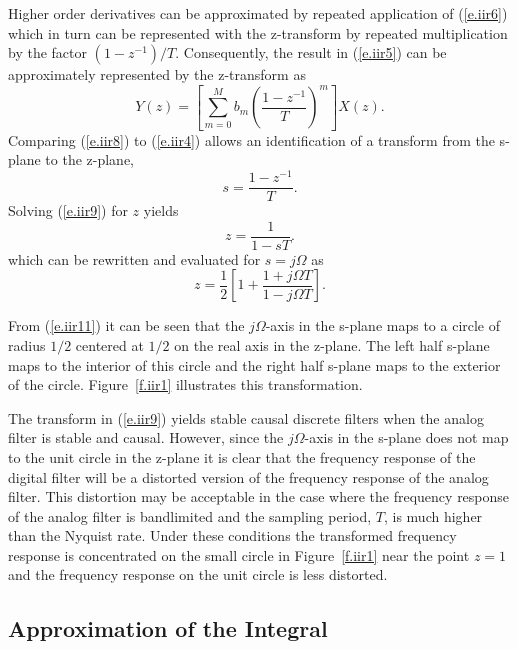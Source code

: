 	Higher order derivatives can be approximated by
repeated application of (\ref{e.iir6}) which in turn can be
represented with the z-transform by repeated multiplication
by the factor $(1-z^{-1})/T$.  Consequently, the result
in (\ref{e.iir5}) can be approximately represented by the z-transform
as
%
\begin{equation}
[\sum_{n=0}^{N}a_n(\frac{1-z^{-1}}{T})^n]Y(z)
=[\sum_{m=0}^{M}b_m(\frac{1-z^{-1}}{T})^m]X(z).
\label{e.iir8}
\end{equation}
%
Comparing (\ref{e.iir8}) to (\ref{e.iir4}) allows an identification of a
transform from the s-plane to the z-plane,
%
\begin{equation}
s=\frac{1-z^{-1}}{T}.
\label{e.iir9}
\end{equation}
%
Solving (\ref{e.iir9}) for $z$ yields
%
\begin{equation}
z=\frac{1}{1-sT}.
\label{e.iir10}
\end{equation}
%
which can be rewritten and evaluated for
$s=j\Omega$ as
%
\begin{equation}
z=\frac{1}{2}[1+\frac{1+j\Omega T}{1-j\Omega T}].
\label{e.iir11}
\end{equation}
%

	From (\ref{e.iir11}) it can be seen that the $j\Omega$-axis
in the s-plane maps to a circle of radius $1/2$ centered at
$1/2$ on the real axis in the z-plane.  The left half s-plane
maps to the interior of this circle and the right half s-plane
maps to the exterior of the circle.  Figure~\ref{f.iir1} illustrates
this transformation.
%

%

	The transform in (\ref{e.iir9}) yields stable causal discrete
filters when the analog filter is stable and causal.  However, since
the $j\Omega$-axis in the s-plane does not map to the unit circle
in the z-plane it is clear that the frequency response of the
digital filter will be a distorted version of the frequency
response of the analog filter.  This distortion may be acceptable
in the case where the frequency response of the analog
filter is bandlimited and the sampling period, $T$,
is much higher than the Nyquist rate.  Under these conditions
the transformed frequency response is concentrated on the small
circle in Figure~\ref{f.iir1} near the point $z=1$ and the 
frequency response on the unit circle is less distorted.

\subsection{Approximation of the Integral}

